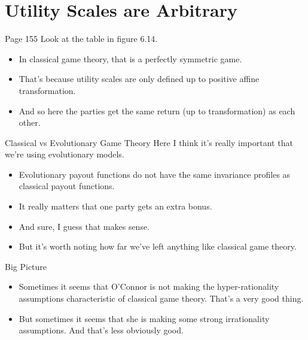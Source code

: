 \documentclass[
  ignorenonframetext,
]{beamer}
\providecommand{\tightlist}{%
  \setlength{\itemsep}{0pt}\setlength{\parskip}{0pt}}
\begin{document}
\hypertarget{utility-scales-are-arbitrary}{%
\section{Utility Scales are
Arbitrary}\label{utility-scales-are-arbitrary}}

\begin{frame}{Page 155}
\protect\hypertarget{page-155}{}
Look at the table in figure 6.14.

\begin{itemize}
\tightlist
\item
  In classical game theory, that is a perfectly symmetric game.
\item
  That's because utility scales are only defined up to positive affine
  transformation.
\item
  And so here the parties get the same return (up to transformation) as
  each other.
\end{itemize}
\end{frame}

\begin{frame}{Classical vs Evolutionary Game Theory}
\protect\hypertarget{classical-vs-evolutionary-game-theory}{}
Here I think it's really important that we're using evolutionary models.

\begin{itemize}
\tightlist
\item
  Evolutionary payout functions do not have the same invariance profiles
  as classical payout functions.
\item
  It really matters that one party gets an extra bonus.
\item
  And sure, I guess that makes sense.
\item
  But it's worth noting how far we've left anything like classical game
  theory.
\end{itemize}
\end{frame}

\begin{frame}{Big Picture}
\protect\hypertarget{big-picture}{}
\begin{itemize}[<+->]
\tightlist
\item
  Sometimes it seems that O'Connor is not making the hyper-rationality
  assumptions characteristic of classical game theory. That's a very
  good thing.
\item
  But sometimes it seems that she is making some strong irrationality
  assumptions. And that's less obviously good.
\end{itemize}
\end{frame}
\end{document}

